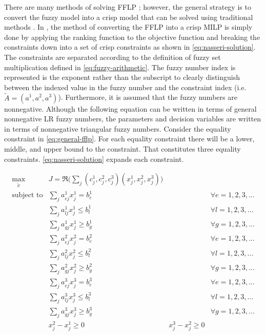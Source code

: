 \documentclass[ee,msthesis]{usuthesis}
\begin{document}
There are many methods of solving FFLP
\cite{bello-2019-fuzzy-activ,kaur-2016-introd-fuzzy,ebrahimnejad-2016-new-method,nasseri-2013-fully}; however, the
general strategy is to convert the fuzzy model into a crisp model that can be solved using traditional methods
\cite{bello-2019-fuzzy-activ}. In \cite{nasseri-2013-fully,bello-2019-fuzzy-activ}, the method of converting the FFLP
into a crisp MILP is simply done by applying the ranking function to the objective function and breaking the constraints
down into a set of crisp constraints as shown in \ref{eq:nasseri-solution}. The constraints are separated according to the
definition of fuzzy set multiplication defined in \ref{eq:fuzzy-arithmetic}. The fuzzy number index is represented is the
exponent rather than the subscript to clearly distinguish between the indexed value in the fuzzy number and the
constraint index (i.e. \(\tilde{A} = (a^1,a^2,a^3)\)). Furthermore, it is assumed that the fuzzy numbers are nonnegative.
Although the following equation can be written in terms of general nonnegative LR fuzzy numbers, the parameters and
decision variables are written in terms of nonnegative triangular fuzzy numbers. Consider the equality constraint in
\ref{eq:general-fflp}. For each equality constraint there will be a lower, middle, and upper bound to the constraint. That
constitutes three equality constraints. \ref{eq:nasseri-solution} expands each constraint.

\begin{equation}
\label{eq:nasseri-solution}
\begin{array}{lclc}
\underset{{\tilde{x}}}{\text{max}}   & J = \mathfrak{R}\Big(\sum_j (c_j^1,c_j^2,c_j^3)(x_j^1,x_j^2,x_j^3)\Big) &\\
\text{subject to} & \sum_j a_{ej}^1 x_j^1 = b_e^1 & & \forall e = 1,2,3,... \\
                  & \sum_j a_{lj}^1 x_j^1 \le b_l^1 & & \forall l = 1,2,3,... \\
                  & \sum_j a_{gj}^1 x_j^1 \ge b_g^1  & & \forall g = 1,2,3,... \\
                  & \sum_j a_{ej}^2 x_j^2 = b_e^2 & & \forall e = 1,2,3,... \\
                  & \sum_j a_{lj}^2 x_j^2 \le b_l^2 & & \forall l = 1,2,3,... \\
                  & \sum_j a_{gj}^2 x_j^2 \ge b_g^2  & & \forall g = 1,2,3,... \\
                  & \sum_j a_{ej}^3 x_j^3 = b_e^3 & & \forall e = 1,2,3,... \\
                  & \sum_j a_{lj}^3 x_j^3 \le b_l^3 & & \forall l = 1,2,3,... \\
                  & \sum_j a_{gj}^3 x_j^3 \ge b_g^3  & & \forall g = 1,2,3,... \\
                  & x_j^2 - x_j^1 \ge 0         & x_j^3 - x_j^2 \ge 0 & \\
\end{array}
\end{equation}
\end{document}
